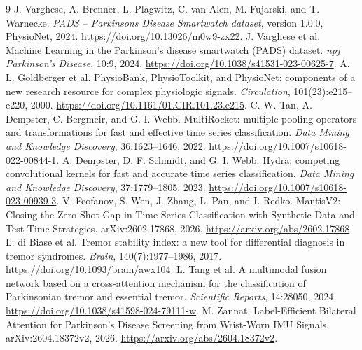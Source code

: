 \documentclass[11pt,a4paper]{article}
\numberwithin{equation}{section}
\begin{document}
\clearpage
\begin{thebibliography}{9}
 J. Varghese, A. Brenner, L. Plagwitz, C. van Alen, M. Fujarski, and T. Warnecke.
\emph{PADS -- Parkinsons Disease Smartwatch dataset}, version 1.0.0, PhysioNet, 2024.
\url{https://doi.org/10.13026/m0w9-zx22}.
 J. Varghese et al.
Machine Learning in the Parkinson's disease smartwatch (PADS) dataset.
\emph{npj Parkinson's Disease}, 10:9, 2024.
\url{https://doi.org/10.1038/s41531-023-00625-7}.
 A. L. Goldberger et al.
PhysioBank, PhysioToolkit, and PhysioNet: components of a new research resource for complex physiologic signals.
\emph{Circulation}, 101(23):e215--e220, 2000.
\url{https://doi.org/10.1161/01.CIR.101.23.e215}.
 C. W. Tan, A. Dempster, C. Bergmeir, and G. I. Webb.
MultiRocket: multiple pooling operators and transformations for fast and effective time series classification.
\emph{Data Mining and Knowledge Discovery}, 36:1623--1646, 2022.
\url{https://doi.org/10.1007/s10618-022-00844-1}.
 A. Dempster, D. F. Schmidt, and G. I. Webb.
Hydra: competing convolutional kernels for fast and accurate time series classification.
\emph{Data Mining and Knowledge Discovery}, 37:1779--1805, 2023.
\url{https://doi.org/10.1007/s10618-023-00939-3}.
 V. Feofanov, S. Wen, J. Zhang, L. Pan, and I. Redko.
MantisV2: Closing the Zero-Shot Gap in Time Series Classification with Synthetic Data and Test-Time Strategies.
arXiv:2602.17868, 2026. \url{https://arxiv.org/abs/2602.17868}.
 L. di Biase et al.
Tremor stability index: a new tool for differential diagnosis in tremor syndromes.
\emph{Brain}, 140(7):1977--1986, 2017.
\url{https://doi.org/10.1093/brain/awx104}.
 L. Tang et al.
A multimodal fusion network based on a cross-attention mechanism for the classification of Parkinsonian tremor and essential tremor.
\emph{Scientific Reports}, 14:28050, 2024.
\url{https://doi.org/10.1038/s41598-024-79111-w}.
 M. Zannat.
Label-Efficient Bilateral Attention for Parkinson's Disease Screening from Wrist-Worn IMU Signals.
arXiv:2604.18372v2, 2026. \url{https://arxiv.org/abs/2604.18372v2}.
\end{thebibliography}
\end{document}
